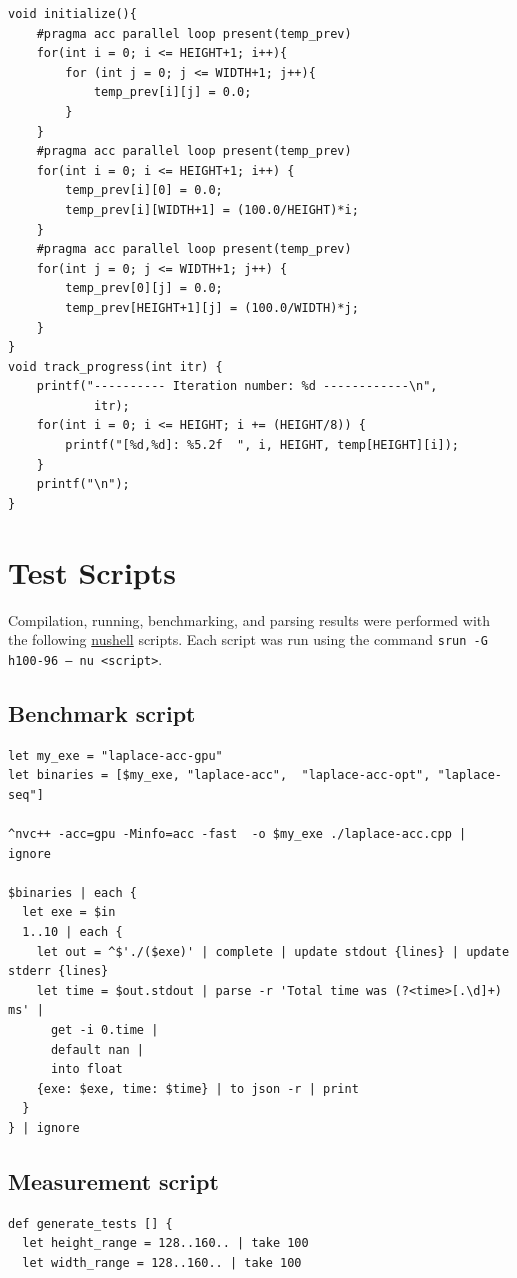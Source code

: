 \documentclass{article}
\begin{document}
\begin{appendices}
\begin{verbatim}
void initialize(){
    #pragma acc parallel loop present(temp_prev)
    for(int i = 0; i <= HEIGHT+1; i++){
        for (int j = 0; j <= WIDTH+1; j++){
            temp_prev[i][j] = 0.0;
        }
    }
    #pragma acc parallel loop present(temp_prev)
    for(int i = 0; i <= HEIGHT+1; i++) {
        temp_prev[i][0] = 0.0;
        temp_prev[i][WIDTH+1] = (100.0/HEIGHT)*i;
    }
    #pragma acc parallel loop present(temp_prev)
    for(int j = 0; j <= WIDTH+1; j++) {
        temp_prev[0][j] = 0.0;
        temp_prev[HEIGHT+1][j] = (100.0/WIDTH)*j;
    }
}
void track_progress(int itr) {
    printf("---------- Iteration number: %d ------------\n",
            itr);
    for(int i = 0; i <= HEIGHT; i += (HEIGHT/8)) {
        printf("[%d,%d]: %5.2f  ", i, HEIGHT, temp[HEIGHT][i]);
    }
    printf("\n");
}
  \end{verbatim}

  \clearpage
  \section{Test Scripts}
  Compilation, running, benchmarking, and parsing results were performed with the following
  \href{https://www.nushell.sh/}{nushell} scripts. Each script was run using the command
  \texttt{srun -G h100-96 -- nu <script>}.

  \subsection{Benchmark script}
  \begin{verbatim}
let my_exe = "laplace-acc-gpu"
let binaries = [$my_exe, "laplace-acc",  "laplace-acc-opt", "laplace-seq"]

^nvc++ -acc=gpu -Minfo=acc -fast  -o $my_exe ./laplace-acc.cpp | ignore

$binaries | each {
  let exe = $in
  1..10 | each {
    let out = ^$'./($exe)' | complete | update stdout {lines} | update stderr {lines}
    let time = $out.stdout | parse -r 'Total time was (?<time>[.\d]+) ms' | 
      get -i 0.time |
      default nan |
      into float
    {exe: $exe, time: $time} | to json -r | print
  }
} | ignore
  \end{verbatim}
  
  \subsection{Measurement script}
\begin{verbatim}
def generate_tests [] {
  let height_range = 128..160.. | take 100
  let width_range = 128..160.. | take 100
  

\end{verbatim}
\end{appendices}
\end{document}
